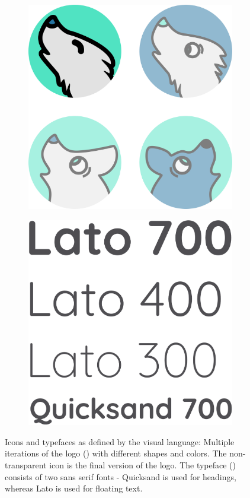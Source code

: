 \documentclass[12pt,numbers=noenddot,parskip,bibliography=totocnumbered,listof=totocnumbered,draft]{scrreprt}
\begin{document}
\begin{figure}
\begin{subfigure}[t]{0.45\textwidth}%
\centering
\includegraphics[width=\linewidth]{icons.png}
\caption{}
\label{icons}
\end{subfigure}%
\hfill
\begin{subfigure}[t]{0.45\textwidth}%
\centering
\includegraphics[width=\linewidth]{fonts.png}
\caption{}
\label{fonts}
\end{subfigure}%
\caption[Icons and typefaces]{Icons and typefaces as defined by the visual language: Multiple iterations of the logo () with different shapes and colors. The non-transparent icon is the final version of the logo. The typeface () consists of two sans serif fonts - Quicksand is used for headings, whereas Lato is used for floating text.}
\end{figure}
\end{document}
